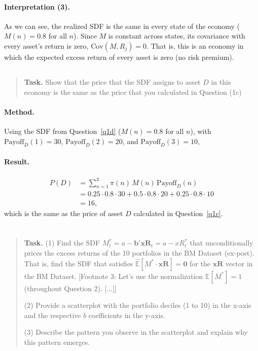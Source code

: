 \documentclass[11pt]{article}
\newcommand{\task}[1]{\begin{quote}\small\textbf{Task.} #1\end{quote}}
\begin{document}
\paragraph{Interpretation (3).}
As we can see, the realized SDF is the same in every state of the economy ($M(n) = 0.8$ for all $n$). Since
$M$ is constant across states, its covariance with every asset's return is zero,
$\mathrm{Cov}(M, R_j) = 0$. That is, this is an economy in which the expected excess return of every asset is
zero (no risk premium).

\subsection{}\label{q1e}
\task{Show that the price that the SDF assigns to asset $D$ in this economy is the same as the price that you calculated in Question (1c)}
\paragraph{Method.}
Using the SDF from Question~\ref{q1d} ($M(n) = 0.8$ for all $n$), with $\mathrm{Payoff}_D(1) = 30$,
$\mathrm{Payoff}_D(2) = 20$, and $\mathrm{Payoff}_D(3) = 10$,

\paragraph{Result.}
\begin{align*}
  P(D) &= \sum_{n=1}^{3} \pi(n)\,M(n)\,\mathrm{Payoff}_D(n) \\
       &= 0.25 \cdot 0.8 \cdot 30 + 0.5 \cdot 0.8 \cdot 20 + 0.25 \cdot 0.8 \cdot 10 \\
       &= 16,
\end{align*}
which is the same as the price of asset $D$ calculated in Question~\ref{q1c}.

\clearpage
\section{}\label{q2}

\subsection{}\label{q2a}
\task{(1) Find the SDF $M^*_t = a - \mathbf{b}'\mathbf{xR}_t = a - xR^*_t$ that unconditionally prices the excess returns of the 10 portfolios in the BM Dataset (ex-post). That is, find the SDF that satisfies $\widehat{\mathbb{E}}[M^* \cdot \mathbf{xR}] = \mathbf{0}$ for the $\mathbf{xR}$ vector in the BM Dataset. [Footnote 3: Let's use the normalization $\mathbb{E}[M^*] = 1$ (throughout Question 2). [...]]\par (2) Provide a scatterplot with the portfolio deciles (1 to 10) in the x-axis and the respective $b$ coefficients in the y-axis.\par (3) Describe the pattern you observe in the scatterplot and explain why this pattern emerges.}
\end{document}
